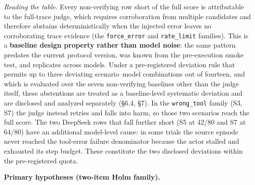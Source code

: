 \documentclass[review]{fcs}
\begin{document}
\emph{Reading the table.} Every non-verifying row short of the full score is attributable to the full-trace judge, which requires corroboration from multiple candidates and therefore abstains deterministically when the injected error leaves no corroborating trace evidence (the \texttt{force\_error} and \texttt{rate\_limit} families). This is a \textbf{baseline design property rather than model noise}: the same pattern predates the current protocol version, was known from the pre-execution smoke test, and replicates across models. Under a pre-registered deviation rule that permits up to three deviating scenario--model combinations out of fourteen, and which is evaluated over the seven non-verifying baselines other than the judge itself, these abstentions are treated as a baseline-level systematic deviation and are disclosed and analyzed separately (\S6.4, \S7). In the \texttt{wrong\_tool} family (S3, S7) the judge instead retries and falls into harm, so those two scenarios reach the full score. The two DeepSeek rows that fall further short (S5 at 42/80 and S7 at 64/80) have an additional model-level cause: in some trials the source episode never reached the tool-error failure denominator because the actor stalled and exhausted its step budget. These constitute the two disclosed deviations within the pre-registered quota.

\textbf{Primary hypotheses (two-item Holm family).}
\end{document}
